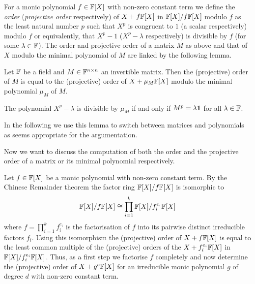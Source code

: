 For a monic polynomial $f \in \mathbb{F}[X]$ with non-zero constant term
we define the \emph{order} (\emph{projective order} respectively) of 
$X + f\mathbb{F}[X]$ in $\mathbb{F}[X]/f\mathbb{F}[X]$ modulo $f$ as the least natural 
number $p$ such that $X^p$ is congruent 
to $1$ (a scalar respectively) modulo $f$ or equivalently, that $X^p-1$ 
($X^p-\lambda$ respectively) is
divisible by $f$ (for some $\lambda \in \mathbb{F}$). 
The order and projective order
of a matrix $M$ as above and that of $X$ modulo the minimal polynomial 
of $M$ are linked by the following lemma.

\begin{Lemm}
Let\/ $\mathbb{F}$ be a field and $M \in \mathbb{F}^{n \times n}$ an invertible matrix.
Then the (projective) order of $M$ is equal to the (projective) order of
$X + \mu_M \mathbb{F}[X]$ modulo the minimal polynomial $\mu_M$ of $M$.
\end{Lemm}
\proofbeg 
The polynomial $X^p-\lambda$ is divisible by $\mu_M$ if and
only if $M^p = \lambda \mathbf{1}$ for all $\lambda \in \mathbb{F}$.
\proofend

In the following we use this lemma to switch between matrices and
polynomials as seems appropriate for the argumentation.

Now we want to discuss the computation of both the order and the
projective order of a matrix or its minimal polynomial respectively.

Let $f \in \mathbb{F}[X]$ be a monic polynomial with non-zero constant term. 
By the Chinese Remainder theorem the factor ring
$\mathbb{F}[X]/f\mathbb{F}[X]$ is isomorphic to
\[ \mathbb{F}[X]/f\mathbb{F}[X] \cong
   \prod_{i=1}^k \mathbb{F}[X]/f_i^{e_i} \mathbb{F}[X] \]
where $f = \prod_{i=1}^k f_i^{e_i}$ is the factorisation of $f$ into
its pairwise distinct irreducible factors $f_i$. Using this
isomorphism the (projective) order of $X+f\mathbb{F}[X]$ is equal to the least 
common multiple of the (projective) orders of the $X + f_i^{e_i}
\mathbb{F}[X]$ in $\mathbb{F}[X]/f_i^{e_i}\mathbb{F}[X]$. Thus, as a first step we factorise
$f$ completely and now determine the (projective) order of
$X+g^e\mathbb{F}[X]$ for an irreducible monic polynomial $g$ of degree $d$ 
with non-zero constant term.

